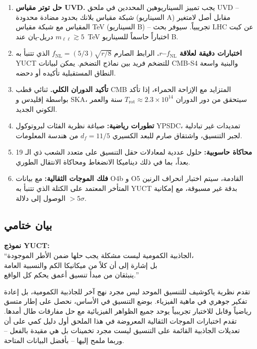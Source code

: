 \documentclass[11pt,a4paper]{article}
\theoremstyle{remark}
\begin{document}
	\begin{enumerate}
		\item \textbf{حل توتر مقياس UVD.} يجب تمييز السيناريوهين المحددين في ملحق UVD – شبكة مقياس بلانك بحدود مضادة محدودة (السيناريو A) مقابل أصل لامتغير المقياس مع شبكة مقياس TeV (السيناريو B) – تجريبياً. سيوفر بحث LHC عن كبت دريل-يان عند $m_{\ell\ell}\gtrsim5$~TeV اختباراً حاسماً للسيناريو B.
		
		\item \textbf{اختبارات دقيقة لعلاقة $f_{\mathrm{NL}}$–$r$.} الرابط الصارم $f_{\mathrm{NL}}=(5/3)\sqrt{r/8}$ الذي تتنبأ به YUCT للتضخم فريد بين نماذج التضخم. يمكن لبيانات CMB-S4 والبنية واسعة النطاق المستقبلية تأكيده أو دحضه.
		
		\item \textbf{تأكيد الدوران الكلي.} ثنائي قطب CMB المتزايد مع الإزاحة الحمراء، إذا تأكد بواسطة إقليدس و SKA، سيتحقق من دور الدوران $T_{\mathrm{rot}}\approx2.3\times10^{14}$ سنة والعمر الكوني الجديد.
		
		\item \textbf{تطورات رياضية:} صياغة نظرية الفئات لبروتوكول YPSDC، تمديدات غير تبادلية لجبر التنسيق، واشتقاق صارم للبعد الكسيري $d_f=11/5$ من هندسة المعلومات.
		
		\item \textbf{محاكاة حاسوبية:} حلول عددية لمعادلات حقل التنسيق على متعدد الشعب ذي الـ 19 بعداً، بما في ذلك ديناميكا الانضغاط ومحاكاة الانتقال الطوري.
		
		\item \textbf{فلك الموجات الثقالية:} مع بيانات O4b و O5 القادمة، سيتم اختبار انحراف الرنين المتأخر المعتمد على الكتلة الذي تتنبأ به YUCT بدقة غير مسبوقة، مع إمكانية الوصول إلى دلالة $>5\sigma$.
	\end{enumerate}
	
	\subsection{بيان ختامي}
	
	\begin{center}
		\textbf{نموذج YUCT:}\\
		``الجاذبية الكمومية ليست مشكلة يجب حلها ضمن الأطر الموجودة،\\
		بل إشارة إلى أن كلاً من ميكانيكا الكم والنسبية العامة\\
		ينبثقان من مبدأ تنسيق أعمق يحكم كل الواقع.''
	\end{center}
	
	تقدم نظرية ياكوشيف للتنسيق الموحد ليس مجرد نهج آخر للجاذبية الكمومية، بل إعادة تفكير جوهري في ماهية الفيزياء. بوضع التنسيق في الأساس، نحصل على إطار متسق رياضياً وقابل للاختبار تجريبياً يوحد جميع الظواهر الفيزيائية مع حل مفارقات طال أمدها. تقدم اختبارات الموجات الثقالية المعروضة في هذا الملحق أول دليل كمي على أن تعديلات الجاذبية القائمة على التنسيق ليست مجرد تخمينات بل هي مقيدة بالفعل – وربما ملمح إليها – بأفضل البيانات المتاحة.
	
\end{document}
